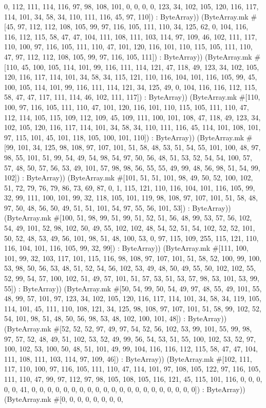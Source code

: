 \documentclass[11pt]{article}
\begin{document}
0, 112, 111, 114, 116, 97, 98, 108, 101, 0, 0, 0, 0, 123, 34, 102, 105, 120, 116, 117, 114, 101, 34, 58, 34, 110, 111, 116, 45, 97, 110]) : ByteArray)) (ByteArray.mk \#[45, 97, 112, 112, 108, 105, 99, 97, 116, 105, 111, 110, 34, 125, 62, 0, 104, 116, 116, 112, 115, 58, 47, 47, 104, 111, 108, 111, 103, 114, 97, 109, 46, 102, 111, 117, 110, 100, 97, 116, 105, 111, 110, 47, 101, 120, 116, 101, 110, 115, 105, 111, 110, 47, 97, 112, 112, 108, 105, 99, 97, 116, 105, 111]) : ByteArray)) (ByteArray.mk \#[110, 45, 100, 105, 114, 101, 99, 116, 111, 114, 121, 47, 118, 49, 123, 34, 102, 105, 120, 116, 117, 114, 101, 34, 58, 34, 115, 121, 110, 116, 104, 101, 116, 105, 99, 45, 100, 105, 114, 101, 99, 116, 111, 114, 121, 34, 125, 49, 0, 104, 116, 116, 112, 115, 58, 47, 47, 117, 111, 114, 46, 102, 111, 117]) : ByteArray)) (ByteArray.mk \#[110, 100, 97, 116, 105, 111, 110, 47, 101, 120, 116, 101, 110, 115, 105, 111, 110, 47, 112, 114, 105, 115, 109, 112, 109, 45, 109, 111, 100, 101, 108, 47, 118, 49, 123, 34, 102, 105, 120, 116, 117, 114, 101, 34, 58, 34, 110, 111, 116, 45, 114, 101, 108, 101, 97, 115, 101, 45, 101, 118, 105, 100, 101, 110]) : ByteArray)) (ByteArray.mk \#[99, 101, 34, 125, 98, 108, 97, 107, 101, 51, 58, 48, 53, 51, 54, 55, 101, 100, 48, 97, 98, 55, 101, 51, 99, 54, 49, 54, 98, 54, 97, 50, 56, 48, 51, 53, 52, 54, 54, 100, 57, 57, 48, 50, 57, 56, 53, 49, 101, 57, 98, 98, 56, 55, 55, 49, 99, 48, 56, 98, 51, 54, 99, 102]) : ByteArray)) (ByteArray.mk \#[101, 51, 51, 101, 98, 49, 50, 52, 100, 102, 51, 72, 79, 76, 79, 86, 73, 69, 87, 0, 1, 115, 121, 110, 116, 104, 101, 116, 105, 99, 32, 99, 111, 100, 101, 99, 32, 118, 105, 101, 119, 98, 108, 97, 107, 101, 51, 58, 48, 97, 50, 48, 56, 50, 49, 51, 51, 101, 54, 97, 55, 56, 101, 53]) : ByteArray)) (ByteArray.mk \#[100, 51, 98, 99, 51, 99, 51, 52, 51, 56, 48, 99, 53, 57, 56, 102, 54, 49, 101, 52, 98, 102, 50, 49, 55, 102, 102, 48, 54, 52, 51, 54, 102, 52, 52, 101, 50, 52, 48, 53, 49, 56, 101, 98, 51, 48, 100, 53, 0, 97, 115, 109, 255, 115, 121, 110, 116, 104, 101, 116, 105, 99, 32, 99]) : ByteArray)) (ByteArray.mk \#[111, 100, 101, 99, 32, 103, 117, 101, 115, 116, 98, 108, 97, 107, 101, 51, 58, 52, 100, 99, 100, 53, 98, 50, 56, 53, 48, 51, 52, 54, 56, 102, 53, 49, 48, 50, 49, 55, 50, 102, 102, 55, 52, 99, 54, 57, 100, 102, 51, 49, 57, 101, 51, 57, 53, 51, 53, 57, 98, 53, 101, 53, 99, 55]) : ByteArray)) (ByteArray.mk \#[50, 54, 99, 50, 54, 49, 97, 48, 55, 49, 101, 55, 48, 99, 57, 101, 97, 123, 34, 102, 105, 120, 116, 117, 114, 101, 34, 58, 34, 119, 105, 114, 101, 45, 111, 110, 108, 121, 34, 125, 98, 108, 97, 107, 101, 51, 58, 99, 102, 52, 54, 101, 98, 51, 48, 50, 56, 98, 53, 48, 102, 100, 101, 48]) : ByteArray)) (ByteArray.mk \#[52, 52, 52, 97, 49, 97, 54, 52, 56, 102, 53, 99, 101, 55, 99, 98, 97, 57, 52, 48, 49, 51, 102, 53, 52, 49, 99, 56, 54, 53, 51, 55, 100, 102, 53, 52, 97, 100, 102, 53, 100, 50, 48, 51, 101, 49, 99, 104, 116, 116, 112, 115, 58, 47, 47, 104, 111, 108, 111, 103, 114, 97, 109, 46]) : ByteArray)) (ByteArray.mk \#[102, 111, 117, 110, 100, 97, 116, 105, 111, 110, 47, 114, 101, 97, 108, 105, 122, 97, 116, 105, 111, 110, 47, 99, 97, 112, 97, 98, 105, 108, 105, 116, 121, 45, 115, 101, 116, 0, 0, 0, 0, 0, 41, 0, 0, 0, 0, 0, 0, 0, 0, 0, 0, 0, 0, 0, 0, 0, 0, 0, 0, 0, 0, 0]) : ByteArray)) (ByteArray.mk \#[0, 0, 0, 0, 0, 0, 0, 0, 
\end{document}
